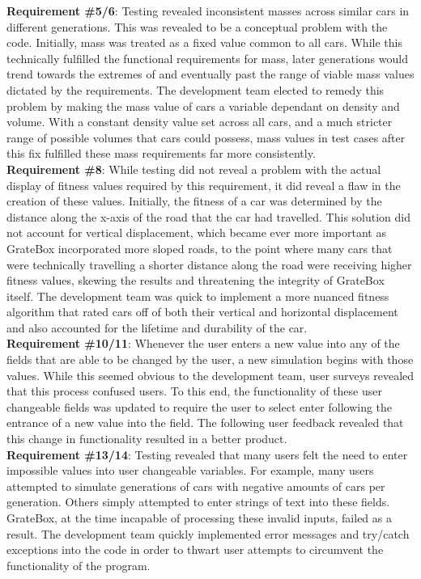 \documentclass[12pt, titlepage]{article}
\begin{document}
\textbf{Requirement \#5/6}: Testing revealed inconsistent masses across similar 
cars in different generations. This was revealed to be a conceptual problem with 
the code. Initially, mass was treated as a fixed value common to all cars. While 
this technically fulfilled the functional requirements for mass, later 
generations would trend towards the extremes of and eventually past the range of 
viable mass values dictated by the requirements. The development team elected to 
remedy this problem by making the mass value of cars a variable dependant on 
density and volume. With a constant density value set across all cars, and a 
much stricter range of possible volumes that cars could possess, mass values in 
test cases after this fix fulfilled these mass requirements far more 
consistently.\\

\textbf{Requirement \#8}: While testing did not reveal a problem with the actual 
display of fitness values required by this requirement, it did reveal a flaw in 
the creation of these values. Initially, the fitness of a car was determined by 
the distance along the x-axis of the road that the car had travelled. This 
solution did not account for vertical displacement, which became ever more 
important as GrateBox incorporated more sloped roads, to the point where many 
cars that were technically travelling a shorter distance along the road were 
receiving higher fitness values, skewing the results and threatening the 
integrity of GrateBox itself. The development team was quick to implement a more 
nuanced fitness algorithm that rated cars off of both their vertical and 
horizontal displacement and also accounted for the lifetime and durability of 
the car.\\

\textbf{Requirement \#10/11}: Whenever the user enters a new value into any of 
the fields that are able to be changed by the user, a new simulation begins with 
those values. While this seemed obvious to the development team, user surveys 
revealed that this process confused users. To this end, the functionality of 
these user changeable fields was updated to require the user to select enter 
following the entrance of a new value into the field. The following user 
feedback revealed that this change in functionality resulted in a better 
product.\\

\textbf{Requirement \#13/14}: Testing revealed that many users felt the need to 
enter impossible values into user changeable variables. For example, many users 
attempted to simulate generations of cars with negative amounts of cars per 
generation. Others simply attempted to enter strings of text into these fields. 
GrateBox, at the time incapable of processing these invalid inputs, failed as a 
result. The development team quickly implemented error messages and try/catch 
exceptions into the code in order to thwart user attempts to circumvent the 
functionality of the program.\\
\end{document}
